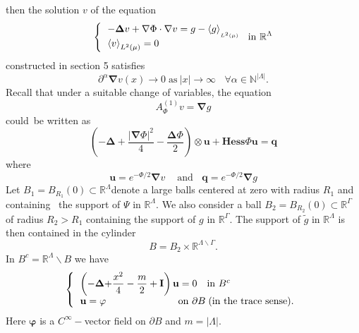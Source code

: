 \documentclass{article}
\begin{document}
then the solution $v$ of the equation 
\begin{equation}
\left\{ 
\begin{tabular}{l}
$-\mathbf{\Delta }v+\mathbf{\nabla }\Phi \cdot \mathbf{\nabla }%
v=g-\left\langle g\right\rangle _{_{L^{2}(\mu )}}$ \\ 
$\left\langle v\right\rangle _{L^{2}(\mu )}=0$%
\end{tabular}%
\right. \text{in }\mathbb{R}^{\Lambda }
\end{equation}%
constructed in section 5 satisfies 
\begin{equation}
\partial ^{\alpha }\mathbf{\nabla }v(x)\rightarrow 0\;\text{as}\ \left|
x\right| \rightarrow \infty \ \ \ \ \forall \alpha \in \mathbb{N}^{\left|
\Lambda \right| }.
\end{equation}%
Recall that under a suitable change of variables, the equation 
\begin{equation}
A_{\Phi }^{(1)}v=\mathbf{\nabla }g
\end{equation}%
could\ be written as 
\begin{equation}
\left( \mathbf{-\Delta +}\frac{\left| \mathbf{\nabla }\Phi \right| ^{2}}{4}-%
\frac{\mathbf{\Delta }\Phi }{2}\right) \otimes \mathbf{u}+\mathbf{Hess}\Phi 
\mathbf{u}=\mathbf{q}
\end{equation}%
where 
\begin{equation}
\mathbf{u}=e^{-\Phi /2}\mathbf{\nabla }v\ \ \ \ \text{\ and}\ \ \ \mathbf{\ q%
}=e^{-\Phi /2}\mathbf{\nabla }g
\end{equation}%
Let $B_{1}=B_{R_{1}}(0)\subset \mathbb{R}^{\Lambda }$denote a large balls
centered at zero with radius $R_{1}$ and containing \ the support of $\Psi $
in $\mathbb{R}^{\Lambda }.$ We also consider a ball $B_{2}=B_{R_{2}}(0)%
\subset \mathbb{R}^{\Gamma }$ of radius $R_{2}>R_{1}$ containing the support
of $g$ in $\mathbb{R}^{\Gamma }.$ The support of $\tilde{g}$ in $\mathbb{R}%
^{\Lambda }$ is then contained in the cylinder%
\begin{equation*}
B=B_{2}\times \mathbb{R}^{\Lambda \backslash \Gamma }.
\end{equation*}%
In $B^{c}=\mathbb{R}^{\Lambda }\backslash B$ we have%
\begin{equation}
\left\{ 
\begin{tabular}{l}
$\left( \mathbf{-\Delta +}\dfrac{x^{2}}{4}-\dfrac{m}{2}+\mathbf{I}\right) 
\mathbf{u}=0$ \ \ in $B^{c}$ \\ 
$\mathbf{u}=\mathbf{\varphi }$ \ \ \ \ \ \ \ \ \ \ \ \ \ \ \ \ \ \ \ \ \ on $%
\partial B\;($in the trace sense$).$%
\end{tabular}%
\right.
\end{equation}%
Here $\mathbf{\varphi }$ is a $C^{\infty }-$vector field on $\partial B$ and 
$m=\left| \Lambda \right| .$
\end{document}
